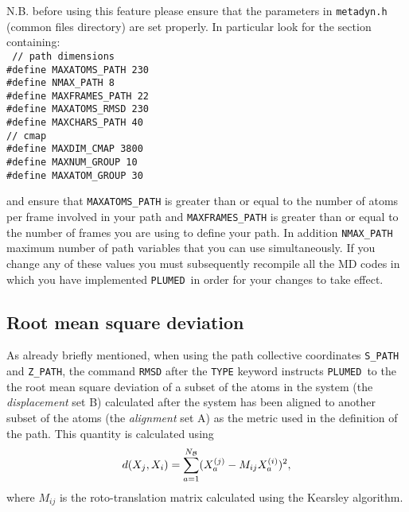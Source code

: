 \documentclass[12pt,fleqn]{report}
\newcommand{\keyword}[1]{\index{Keywords!{\tt #1}} {\tt #1}}
\newcommand{\plumed}{{\tt PLUMED}}
\begin{document}
N.B. before using this feature please ensure that the parameters in {\tt metadyn.h} (common files directory) are 
set properly. In particular look for the section containing: 
\\
{\tt
// path dimensions\\
\#define MAXATOMS\_PATH 230 \\
\#define NMAX\_PATH 8 \\
\#define MAXFRAMES\_PATH 22  \\
\#define MAXATOMS\_RMSD 230 \\
\#define MAXCHARS\_PATH 40 \\
// cmap \\
\#define MAXDIM\_CMAP 3800 \\
\#define MAXNUM\_GROUP 10 \\
\#define MAXATOM\_GROUP 30 \\
}

and ensure that {\tt MAXATOMS\_PATH} is greater than or equal to the number of atoms per frame involved in your 
path and {\tt MAXFRAMES\_PATH} is greater than or equal to the number of frames you are using to define your path.
In addition {\tt NMAX\_PATH } maximum number of path variables that you can use simultaneously.  If you change any
of these values you must subsequently recompile all the MD codes in which you have implemented \plumed\ in order for your 
changes to take effect.  


\subsection{Root mean square deviation}
\label{ssc.rmsd}
 As already briefly mentioned, when using the path collective coordinates \keyword{S\_PATH} and \keyword{Z\_PATH},
 the command {\tt RMSD} after the {\tt TYPE} keyword instructs \plumed\ to the the root mean square deviation of a 
 subset of the atoms in the system (the {\it displacement} set {\cal B}) calculated after the system has been aligned 
 to another subset of the atoms (the {\it alignment} set {\cal A}) as the metric used in the definition of the path.  
 This quantity is calculated using 
 $$ d(X_j,X_i) = \sum_{a=1}^{N_{\cal B}} 
  (X^{(j)}_a - M_{ij} X^{(i)}_a)^2,$$
 where  $M_{ij}$ is the roto-translation matrix calculated using the Kearsley \cite{kearsley} algorithm.
\end{document}
